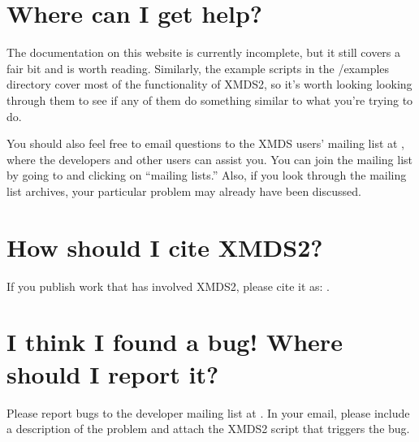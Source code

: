 \documentclass[letterpaper,10pt,english]{sphinxmanual}
\begin{document}
\section{Where can I get help?}
\label{\detokenize{faq:where-can-i-get-help}}
\sphinxAtStartPar
The documentation on this website is currently incomplete, but it still covers a fair bit and is worth reading. Similarly, the example scripts in the /examples directory cover most of the functionality of XMDS2, so it’s worth looking looking through them to see if any of them do something similar to what you’re trying to do.

\sphinxAtStartPar
You should also feel free to email questions to the XMDS users’ mailing list at , where the developers and other users can assist you. You can join the mailing list by going to  and clicking on “mailing lists.” Also, if you look through the mailing list archives, your particular problem may already have been discussed.

\ignorespaces 

\section{How should I cite XMDS2?}
\label{\detokenize{faq:how-should-i-cite-xmds2}}\label{\detokenize{faq:index-1}}
\sphinxAtStartPar
If you publish work that has involved XMDS2, please cite it as: .

\ignorespaces 

\section{I think I found a bug! Where should I report it?}
\label{\detokenize{faq:i-think-i-found-a-bug-where-should-i-report-it}}\label{\detokenize{faq:index-2}}
\sphinxAtStartPar
Please report bugs to the developer mailing list at . In your email, please include a description of the problem and attach the XMDS2 script that triggers the bug.

\ignorespaces 
\end{document}
